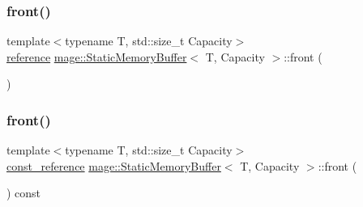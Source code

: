 \mbox{\label{classmage_1_1_static_memory_buffer_a2aa14c910216dce870c415752801d04d}} 
\subsubsection{\texorpdfstring{front()}{front()}\hspace{0.1cm}{\footnotesize\ttfamily [1/2]}}
{\footnotesize\ttfamily template$<$typename T, std\+::size\+\_\+t Capacity$>$ \\
\mbox{\hyperlink{classmage_1_1_static_memory_buffer_ac00b0718b8b57bcaee2a7904637fc031}{reference}} \mbox{\hyperlink{classmage_1_1_static_memory_buffer}{mage\+::\+Static\+Memory\+Buffer}}$<$ T, Capacity $>$\+::front (\begin{DoxyParamCaption}{ }\end{DoxyParamCaption})\hspace{0.3cm}{\ttfamily [noexcept]}}

\mbox{\label{classmage_1_1_static_memory_buffer_a14321e82ca518c411b14fc53a4789b34}} 
\subsubsection{\texorpdfstring{front()}{front()}\hspace{0.1cm}{\footnotesize\ttfamily [2/2]}}
{\footnotesize\ttfamily template$<$typename T, std\+::size\+\_\+t Capacity$>$ \\
\mbox{\hyperlink{classmage_1_1_static_memory_buffer_a2d961d7baf56ebc96e1e48579bcdcb84}{const\+\_\+reference}} \mbox{\hyperlink{classmage_1_1_static_memory_buffer}{mage\+::\+Static\+Memory\+Buffer}}$<$ T, Capacity $>$\+::front (\begin{DoxyParamCaption}{ }\end{DoxyParamCaption}) const\hspace{0.3cm}{\ttfamily [noexcept]}}

\mbox{\label{classmage_1_1_static_memory_buffer_a5ddee6fdf33505dbc2460a3c11fc3b83}} 
